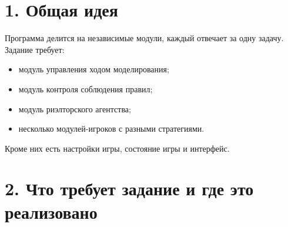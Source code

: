 \documentclass[
]{article}
\author{}
\date{}
\providecommand{\tightlist}{%
  \setlength{\itemsep}{0pt}\setlength{\parskip}{0pt}}
\begin{document}
\section{1. Общая
идея}\label{ux43eux431ux449ux430ux44f-ux438ux434ux435ux44f}

Программа делится на независимые модули, каждый отвечает за одну задачу.
Задание требует:

\begin{itemize}
\tightlist
\item
  модуль управления ходом моделирования;
\item
  модуль контроля соблюдения правил;
\item
  модуль риэлторского агентства;
\item
  несколько модулей-игроков с разными стратегиями.
\end{itemize}

Кроме них есть настройки игры, состояние игры и интерфейс.

\section{2. Что требует задание и где это
реализовано}\label{ux447ux442ux43e-ux442ux440ux435ux431ux443ux435ux442-ux437ux430ux434ux430ux43dux438ux435-ux438-ux433ux434ux435-ux44dux442ux43e-ux440ux435ux430ux43bux438ux437ux43eux432ux430ux43dux43e}
\end{document}
